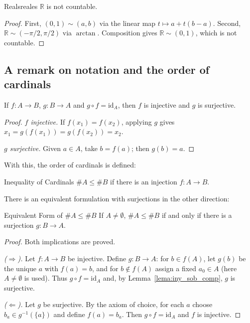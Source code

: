 \documentclass[11pt, a4paper]{article}
\begin{document}
\begin{corolario}{Reals}{reales}
$\mathbb{R}$ is not countable.
\end{corolario}

\begin{proof}
First, $(0,1) \sim (a,b)$ via the linear map $t \mapsto a + t(b-a)$. Second,
$\mathbb{R} \sim (-\pi/2, \pi/2)$ via $\arctan$. Composition gives $\mathbb{R} \sim (0,1)$, which is not
countable.
\end{proof}

\subsection*{A remark on notation and the order of cardinals}

\begin{lema}\label{lema:iny_sob_comp}
If $f: A \to B$, $g: B \to A$ and $g \circ f = \mathrm{id}_A$, then $f$ is injective and $g$ is
surjective.
\end{lema}

\begin{proof}
\textit{$f$ injective.} If $f(x_1) = f(x_2)$, applying $g$ gives $x_1 = g(f(x_1)) = g(f(x_2)) = x_2$.

\textit{$g$ surjective.} Given $a \in A$, take $b = f(a)$; then $g(b) = a$.
\end{proof}

With this, the order of cardinals is defined:

\begin{definicion}{Inequality of Cardinals}{}
$\#A \le \#B$ if there is an injection $f: A \to B$.
\end{definicion}

There is an equivalent formulation with surjections in the other direction:

\begin{proposicion}{Equivalent Form of $\#A \le \#B$}{}
If $A \ne \emptyset$, $\#A \le \#B$ if and only if there is a surjection $g: B \to A$.
\end{proposicion}

\begin{proof}
Both implications are proved.

\textit{($\Rightarrow$).} Let $f: A \to B$ be injective. Define $g: B \to A$: for $b \in f(A)$,
let $g(b)$ be the unique $a$ with $f(a) = b$, and for $b \notin f(A)$ assign a fixed $a_0 \in A$
(here $A \ne \emptyset$ is used). Thus $g \circ f = \mathrm{id}_A$ and, by
Lemma~\ref{lema:iny_sob_comp}, $g$ is surjective.

\textit{($\Leftarrow$).} Let $g$ be surjective. By the axiom of choice, for each $a$ choose
$b_a \in g^{-1}(\{a\})$ and define $f(a) = b_a$. Then $g \circ f = \mathrm{id}_A$ and $f$ is
injective.
\end{proof}
\end{document}
